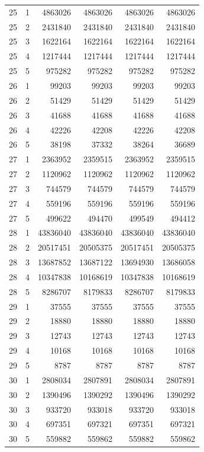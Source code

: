 \begin{longtable}{rrrrrr}
25 & 1 & 4863026 & 4863026 & 4863026 & 4863026 \\
25 & 2 & 2431840 & 2431840 & 2431840 & 2431840 \\
25 & 3 & 1622164 & 1622164 & 1622164 & 1622164 \\
25 & 4 & 1217444 & 1217444 & 1217444 & 1217444 \\
25 & 5 & 975282 & 975282 & 975282 & 975282 \\
26 & 1 & 99203 & 99203 & 99203 & 99203 \\
26 & 2 & 51429 & 51429 & 51429 & 51429 \\
26 & 3 & 41688 & 41688 & 41688 & 41688 \\
26 & 4 & 42226 & 42208 & 42226 & 42208 \\
26 & 5 & 38198 & 37332 & 38264 & 36689 \\
27 & 1 & 2363952 & 2359515 & 2363952 & 2359515 \\
27 & 2 & 1120962 & 1120962 & 1120962 & 1120962 \\
27 & 3 & 744579 & 744579 & 744579 & 744579 \\
27 & 4 & 559196 & 559196 & 559196 & 559196 \\
27 & 5 & 499622 & 494470 & 499549 & 494412 \\
28 & 1 & 43836040 & 43836040 & 43836040 & 43836040 \\
28 & 2 & 20517451 & 20505375 & 20517451 & 20505375 \\
28 & 3 & 13687852 & 13687122 & 13694930 & 13686058 \\
28 & 4 & 10347838 & 10168619 & 10347838 & 10168619 \\
28 & 5 & 8286707 & 8179833 & 8286707 & 8179833 \\
29 & 1 & 37555 & 37555 & 37555 & 37555 \\
29 & 2 & 18880 & 18880 & 18880 & 18880 \\
29 & 3 & 12743 & 12743 & 12743 & 12743 \\
29 & 4 & 10168 & 10168 & 10168 & 10168 \\
29 & 5 & 8787 & 8787 & 8787 & 8787 \\
30 & 1 & 2808034 & 2807891 & 2808034 & 2807891 \\
30 & 2 & 1390496 & 1390292 & 1390496 & 1390292 \\
30 & 3 & 933720 & 933018 & 933720 & 933018 \\
30 & 4 & 697351 & 697321 & 697351 & 697321 \\
30 & 5 & 559882 & 559862 & 559882 & 559862 \\

\end{longtable}
